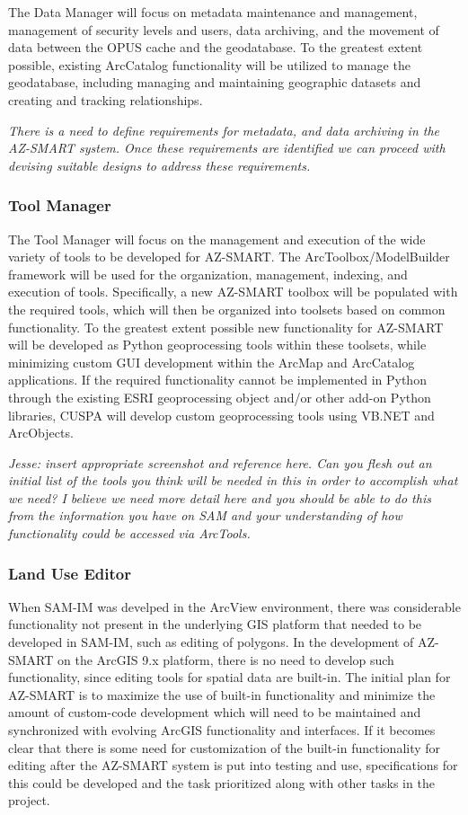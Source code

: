 The Data Manager will focus on metadata maintenance and management, management of security levels and users, data archiving, and the movement of data between the OPUS cache and the geodatabase.  To the greatest extent possible, existing ArcCatalog functionality will be utilized to manage the geodatabase, including managing and maintaining geographic datasets and creating and tracking relationships.

\emph{There is a need to define requirements for metadata, and data archiving in the AZ-SMART system.  Once these requirements are identified we can proceed with devising suitable designs to address these requirements.}

\subsubsection{Tool Manager}

The Tool Manager will focus on the management and execution of the wide variety of tools to be developed for AZ-SMART.  The ArcToolbox/ModelBuilder framework will be used for the organization, management, indexing, and execution of tools.  Specifically, a new AZ-SMART toolbox will be populated with the required tools, which will then be organized into toolsets based on common functionality.  To the greatest extent possible new functionality for AZ-SMART will be developed as Python geoprocessing tools within these toolsets, while minimizing custom GUI development within the ArcMap and ArcCatalog applications.  If the required functionality cannot be implemented in Python through the existing ESRI geoprocessing object and/or other add-on Python libraries, CUSPA will develop custom geoprocessing tools using VB.NET and ArcObjects.

\emph{Jesse: insert appropriate screenshot and reference here.  Can you flesh out an initial list of the tools you think will be needed in this in order to accomplish what we need?  I believe we need more detail here and you should be able to do this from the information you have on SAM and your understanding of how functionality could be accessed via ArcTools.}

\subsubsection{Land Use Editor}
When SAM-IM was develped in the ArcView environment, there was considerable functionality not present in the underlying GIS platform that needed to be developed in SAM-IM, such as editing of polygons.  In the development of AZ-SMART on the ArcGIS 9.x platform, there is no need to develop such functionality, since editing tools for spatial data are built-in.  The initial plan for AZ-SMART is to maximize the use of built-in functionality and minimize the amount of custom-code development which will need to be maintained and synchronized with evolving ArcGIS functionality and interfaces.  If it becomes clear that there is some need for customization of the built-in functionality for editing after the AZ-SMART system is put into testing and use, specifications for this could be developed and the task prioritized along with other tasks in the project.

